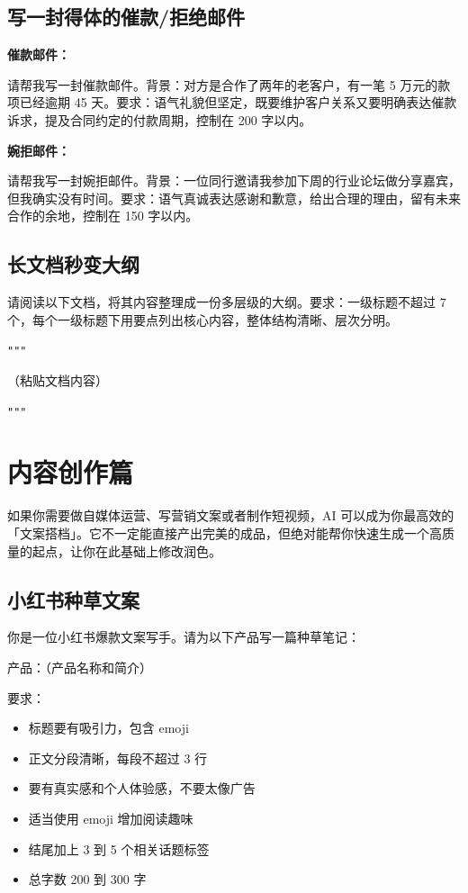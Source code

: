 \subsection*{写一封得体的催款/拒绝邮件}

\textbf{催款邮件：}
\begin{promptbox}
请帮我写一封催款邮件。背景：对方是合作了两年的老客户，有一笔 5 万元的款项已经逾期 45 天。要求：语气礼貌但坚定，既要维护客户关系又要明确表达催款诉求，提及合同约定的付款周期，控制在 200 字以内。
\end{promptbox}

\textbf{婉拒邮件：}
\begin{promptbox}
请帮我写一封婉拒邮件。背景：一位同行邀请我参加下周的行业论坛做分享嘉宾，但我确实没有时间。要求：语气真诚表达感谢和歉意，给出合理的理由，留有未来合作的余地，控制在 150 字以内。
\end{promptbox}

\subsection*{长文档秒变大纲}

\begin{promptbox}
请阅读以下文档，将其内容整理成一份多层级的大纲。要求：一级标题不超过 7 个，每个一级标题下用要点列出核心内容，整体结构清晰、层次分明。

\verb|"""|

（粘贴文档内容）

\verb|"""|
\end{promptbox}

\section{内容创作篇}

如果你需要做自媒体运营、写营销文案或者制作短视频，AI 可以成为你最高效的「文案搭档」。它不一定能直接产出完美的成品，但绝对能帮你快速生成一个高质量的起点，让你在此基础上修改润色。

\subsection*{小红书种草文案}

\begin{promptbox}
你是一位小红书爆款文案写手。请为以下产品写一篇种草笔记：

产品：（产品名称和简介）

要求：
\begin{itemize}
  \item 标题要有吸引力，包含 emoji
  \item 正文分段清晰，每段不超过 3 行
  \item 要有真实感和个人体验感，不要太像广告
  \item 适当使用 emoji 增加阅读趣味
  \item 结尾加上 3 到 5 个相关话题标签
  \item 总字数 200 到 300 字
\end{itemize}
\end{promptbox}


